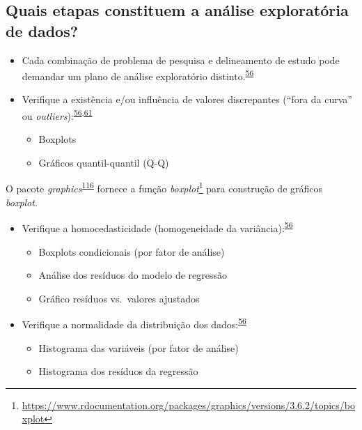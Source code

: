 \documentclass[
]{book}
\renewcommand{\href}[2]{#2\footnote{\url{#1}}}
\newenvironment{infobox}[1]
  {
  \begin{itemize}
  \renewcommand{\labelitemi}{
    \raisebox{-.7\height}[0pt][0pt]{
      {\setkeys{Gin}{width=3em,keepaspectratio}
        \texttt{[image: \#1]}}
    }
  }
  \setlength{\fboxsep}{1em}
  \begin{blackbox}
  \item
  }
  {
  \end{blackbox}
  \end{itemize}
  }
\begin{document}
\hypertarget{quais-etapas-constituem-a-anuxe1lise-exploratuxf3ria-de-dados}{%
\subsection{Quais etapas constituem a análise exploratória de dados?}\label{quais-etapas-constituem-a-anuxe1lise-exploratuxf3ria-de-dados}}

\begin{itemize}
\item
  Cada combinação de problema de pesquisa e delineamento de estudo pode demandar um plano de análise exploratório distinto.\textsuperscript{\protect\hyperlink{ref-zuur2009}{56}}
\item
  Verifique a existência e/ou influência de valores discrepantes (``fora da curva'' ou \emph{outliers}):\textsuperscript{\protect\hyperlink{ref-zuur2009}{56},\protect\hyperlink{ref-Ferketich1986}{61}}

  \begin{itemize}
  \item
    Boxplots
  \item
    Gráficos quantil-quantil (Q-Q)
  \end{itemize}
\end{itemize}

\begin{infobox}{images/Rlogo}
O pacote \emph{graphics}\textsuperscript{\protect\hyperlink{ref-graphics}{116}} fornece a função \href{https://www.rdocumentation.org/packages/graphics/versions/3.6.2/topics/boxplot}{\emph{boxplot}} para construção de gráficos \emph{boxplot}.

\end{infobox}

\begin{itemize}
\item
  Verifique a homocedasticidade (homogeneidade da variância):\textsuperscript{\protect\hyperlink{ref-zuur2009}{56}}

  \begin{itemize}
  \item
    Boxplots condicionais (por fator de análise)
  \item
    Análise dos resíduos do modelo de regressão
  \item
    Gráfico resíduos vs.~valores ajustados
  \end{itemize}
\end{itemize}

\begin{itemize}
\item
  Verifique a normalidade da distribuição dos dados:\textsuperscript{\protect\hyperlink{ref-zuur2009}{56}}

  \begin{itemize}
  \item
    Histograma das variáveis (por fator de análise)
  \item
    Histograma dos resíduos da regressão
  \end{itemize}
\end{itemize}
\end{document}
